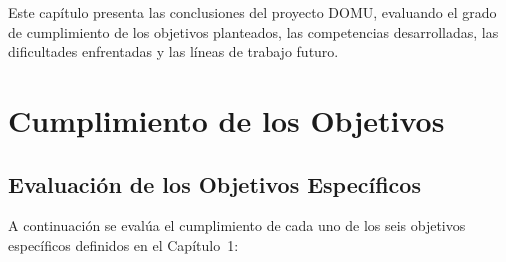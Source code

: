 
Este capítulo presenta las conclusiones del proyecto DOMU, evaluando el grado de cumplimiento de los objetivos planteados, las competencias desarrolladas, las dificultades enfrentadas y las líneas de trabajo futuro.

\section{Cumplimiento de los Objetivos}

\subsection{Evaluación de los Objetivos Específicos}

A continuación se evalúa el cumplimiento de cada uno de los seis objetivos específicos definidos en el Capítulo~1:

